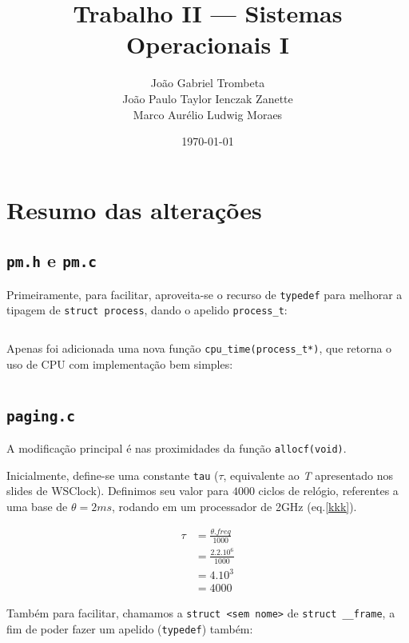 \documentclass{article}
\title{Trabalho II --- Sistemas Operacionais I}
\author{João Gabriel Trombeta\\
        João Paulo Taylor Ienczak Zanette\\
        Marco Aurélio Ludwig Moraes}
\date{\today}
\begin{document}
\maketitle

\section{Resumo das alterações}

\subsection{\texttt{pm.h} e \texttt{pm.c}}

Primeiramente, para facilitar, aproveita-se o recurso de \texttt{typedef} para
melhorar a tipagem de \texttt{struct process}, dando o apelido
\texttt{process\_t}:

\inputminted[firstline=211, lastline=211]{c}{../../include/nanvix/pm.h}

Apenas foi adicionada uma nova função \texttt{cpu\_time(process\_t*)}, que
retorna o uso de CPU com implementação bem simples:

\inputminted[firstline=129,lastline=131]{c}{../../src/kernel/pm/pm.c}

\subsection{\texttt{paging.c}}

A modificação principal é nas proximidades da função \texttt{allocf(void)}.

Inicialmente, define-se uma constante \texttt{tau} ($\tau$\cite{Carr:1981},
equivalente ao \textit{T} apresentado nos slides de WSClock). Definimos seu
valor para $4000$ ciclos de relógio, referentes a uma base de $\theta =
2ms$\cite{Carr:1981}, rodando em um processador de 2GHz (eq.\ref{kkk}).

\begin{align}
    \label{kkk}
    \tau &= \frac{\theta . freq}{1000} \\
         &= \frac{2.2.10^{6}}{1000} \nonumber \\
         &= 4.10^{3} \nonumber \\
         &= 4000 \nonumber
\end{align}

Também para facilitar, chamamos a \texttt{struct <sem nome>} de \texttt{struct
\_\_frame}, a fim de poder fazer um apelido (\texttt{typedef}) também:

\inputminted[firstline=287,lastline=289]{c}{../../src/kernel/mm/paging.c}
\end{document}
